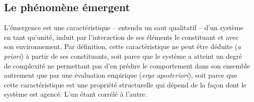 \documentclass{article}
\begin{document}


\subsection{Le phénomène émergent}
 
 L'émergence est une caractéristique -- entendu un saut qualitatif -- d'un système en tant qu'unité, induit par l'interaction de ses éléments le constituant et avec son environnement. Par définition, cette caractéristique ne peut être déduite (\textit{a priori}) à partir de ses constituants, soit parce que le système a atteint un degré de complexité ne permettant pas d'en prédire le comportement dans son ensemble autrement que par une évaluation empirique (\textit{ergo aposteriori}), soit parce que cette caractéristique est une propriété structurelle qui dépend de la façon dont le système est agencé. 
 L'un étant corrélé à l'autre.
\end{document}
